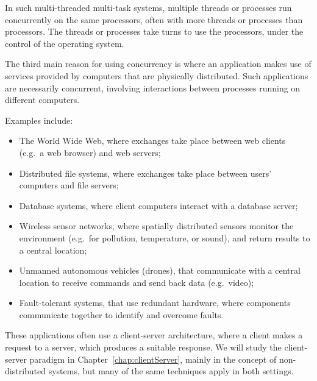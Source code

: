 
In such multi-threaded multi-task systems, multiple threads or processes run
concurrently on the same processors, often with more threads or processes than
processors.  The threads or processes take turns to use the processors, under
the control of the operating system.


The third main reason for using concurrency is where an application makes use
of services provided by computers that are physically
distributed.  Such applications are necessarily
concurrent, involving interactions between processes running on different
computers.

Examples include:
\begin{itemize}
\item The World Wide Web, where exchanges take place between web
clients (e.g.~a web browser) and web servers; 

\item Distributed file systems, where exchanges take place between users'
  computers and file servers;

\item Database systems, where client computers interact with a database
  server;

\item Wireless sensor networks, where spatially distributed sensors monitor
  the environment (e.g.~for pollution, temperature, or sound), and return
  results to a central location;

\item Unmanned autonomous vehicles (drones), that communicate with a central
  location to receive commands and send back data (e.g.~video);

\item Fault-tolerant systems, that use redundant hardware, where components
  communicate together to identify and overcome faults. 
\end{itemize}

These applications often use a client-server architecture, where a client makes a request to a server, which produces a
suitable response.  We will study the client-server paradigm in
Chapter~\ref{chap:clientServer}, mainly in the concept of non-distributed
systems, but many of the same techniques apply in both settings.

